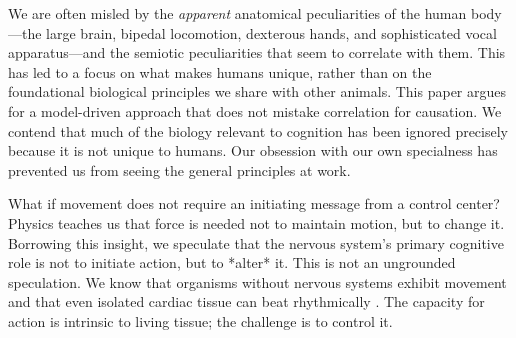 We are often misled by the \textit{apparent} anatomical peculiarities of the human body—the large brain, bipedal locomotion, dexterous hands, and sophisticated vocal apparatus—and the semiotic peculiarities that seem to correlate with them. This has led to a focus on what makes humans unique, rather than on the foundational biological principles we share with other animals. This paper argues for a model-driven approach that does not mistake correlation for causation. We contend that much of the biology relevant to cognition has been ignored precisely because it is not unique to humans. Our obsession with our own specialness has prevented us from seeing the general principles at work.

What if movement does not require an initiating message from a control center? Physics teaches us that force is needed not to maintain motion, but to change it. Borrowing this insight, we speculate that the nervous system's primary cognitive role is not to initiate action, but to *alter* it. This is not an ungrounded speculation. We know that organisms without nervous systems exhibit movement and that even isolated cardiac tissue can beat rhythmically \citep{llinas2002vortex, landecker2007culturing}. The capacity for action is intrinsic to living tissue; the challenge is to control it.

